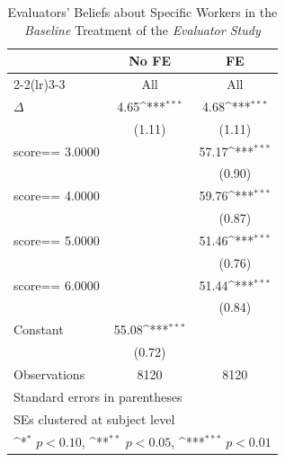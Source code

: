 \begin{table}[htbp]\centering
\def\sym#1{\ifmmode^{#1}\else\(^{#1}\)\fi}
\caption{Evaluators' Beliefs about Specific Workers in the \textit{Baseline} Treatment of the \textit{Evaluator Study}}
\begin{tabular}{l*{2}{c}}
\hline\hline
                &\multicolumn{1}{c}{No FE}&\multicolumn{1}{c}{FE}\\\cmidrule(lr){2-2}\cmidrule(lr){3-3}
                &\multicolumn{1}{c}{All}&\multicolumn{1}{c}{All}\\
\hline
$\Delta$        &     4.65\sym{***}&     4.68\sym{***}\\
                &   (1.11)         &   (1.11)         \\
score==     3.0000&                  &    57.17\sym{***}\\
                &                  &   (0.90)         \\
score==     4.0000&                  &    59.76\sym{***}\\
                &                  &   (0.87)         \\
score==     5.0000&                  &    51.46\sym{***}\\
                &                  &   (0.76)         \\
score==     6.0000&                  &    51.44\sym{***}\\
                &                  &   (0.84)         \\
Constant        &    55.08\sym{***}&                  \\
                &   (0.72)         &                  \\
\hline
Observations    &     8120         &     8120         \\
\hline\hline
\multicolumn{3}{l}{\footnotesize Standard errors in parentheses}\\
\multicolumn{3}{l}{\footnotesize SEs clustered at subject level}\\
\multicolumn{3}{l}{\footnotesize \sym{*} \(p<0.10\), \sym{**} \(p<0.05\), \sym{***} \(p<0.01\)}\\
\end{tabular}
\end{table}
